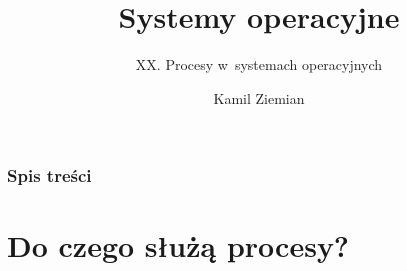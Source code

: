\documentclass[10pt,t]{beamer}
\title{Systemy operacyjne}
\subtitle{XX. Procesy w~systemach operacyjnych}
\author{Kamil Ziemian \\
  \email}
\begin{document}





\RaggedRight





\maketitle










\begin{frame}
  \frametitle{Spis treści}


  \tableofcontents

\end{frame}





\section{Do czego służą procesy?}
\end{document}

